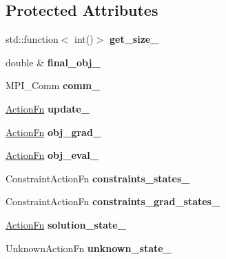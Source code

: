 \subsection*{Protected Attributes}
\begin{DoxyCompactItemize}
\item 
\hypertarget{classop_1_1WaitLoop_a642bd1b3e47036c5568cbb6b6787a4b9}{std\-::function$<$ int()$>$ {\bfseries get\-\_\-size\-\_\-}}\label{classop_1_1WaitLoop_a642bd1b3e47036c5568cbb6b6787a4b9}

\item 
\hypertarget{classop_1_1WaitLoop_a4f1464ba44577c8020b92f7d93d112e0}{double \& {\bfseries final\-\_\-obj\-\_\-}}\label{classop_1_1WaitLoop_a4f1464ba44577c8020b92f7d93d112e0}

\item 
\hypertarget{classop_1_1WaitLoop_a79b4e513e0364b74e4614344d796c08a}{M\-P\-I\-\_\-\-Comm {\bfseries comm\-\_\-}}\label{classop_1_1WaitLoop_a79b4e513e0364b74e4614344d796c08a}

\item 
\hypertarget{classop_1_1WaitLoop_a0d96cc7db72e83fe4febe4feeb191c02}{\hyperlink{namespaceop_af8b17abb60b9f5c60c0a6764d5aa1228}{Action\-Fn} {\bfseries update\-\_\-}}\label{classop_1_1WaitLoop_a0d96cc7db72e83fe4febe4feeb191c02}

\item 
\hypertarget{classop_1_1WaitLoop_ab43f0a743f328462d3174dab0605a1c3}{\hyperlink{namespaceop_af8b17abb60b9f5c60c0a6764d5aa1228}{Action\-Fn} {\bfseries obj\-\_\-grad\-\_\-}}\label{classop_1_1WaitLoop_ab43f0a743f328462d3174dab0605a1c3}

\item 
\hypertarget{classop_1_1WaitLoop_ae85cfe7224b2abf09c2ff9fc0bd74ff6}{\hyperlink{namespaceop_af8b17abb60b9f5c60c0a6764d5aa1228}{Action\-Fn} {\bfseries obj\-\_\-eval\-\_\-}}\label{classop_1_1WaitLoop_ae85cfe7224b2abf09c2ff9fc0bd74ff6}

\item 
\hypertarget{classop_1_1WaitLoop_a04d5649624578117a6ea04939770c657}{Constraint\-Action\-Fn {\bfseries constraints\-\_\-states\-\_\-}}\label{classop_1_1WaitLoop_a04d5649624578117a6ea04939770c657}

\item 
\hypertarget{classop_1_1WaitLoop_a76263e0f6047570a229b2f5affdd8866}{Constraint\-Action\-Fn {\bfseries constraints\-\_\-grad\-\_\-states\-\_\-}}\label{classop_1_1WaitLoop_a76263e0f6047570a229b2f5affdd8866}

\item 
\hypertarget{classop_1_1WaitLoop_ae1fba8044d614753621d9708d57a3eaa}{\hyperlink{namespaceop_af8b17abb60b9f5c60c0a6764d5aa1228}{Action\-Fn} {\bfseries solution\-\_\-state\-\_\-}}\label{classop_1_1WaitLoop_ae1fba8044d614753621d9708d57a3eaa}

\item 
\hypertarget{classop_1_1WaitLoop_a5374e795b5358bbb394b4b5644e92538}{Unknown\-Action\-Fn {\bfseries unknown\-\_\-state\-\_\-}}\label{classop_1_1WaitLoop_a5374e795b5358bbb394b4b5644e92538}

\end{DoxyCompactItemize}



